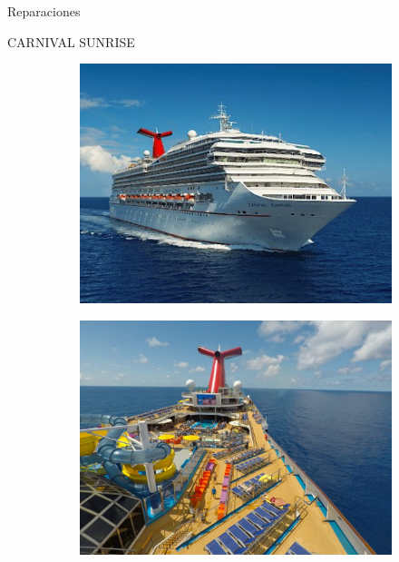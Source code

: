 \documentclass{beamer}
\begin{document}
\begin{frame}{Reparaciones}
\begin{center}
	{\scshape \Huge CARNIVAL SUNRISE}
\end{center}

\begin{figure}
	\centering
	\begin{subfigure}[h]{0.45\textwidth}
		\includegraphics[width=\textwidth]{sr2}
		
	\end{subfigure}       
	\begin{subfigure}[h]{0.45\textwidth} 
		\includegraphics[width=\textwidth]{sr1}
	\end{subfigure}
	\end{figure}
\end{frame}
\end{document}
